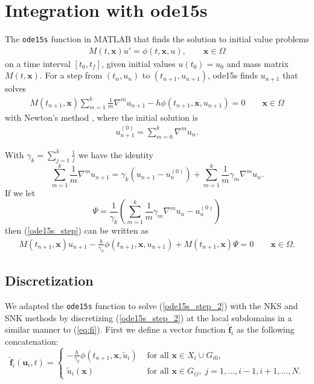 \section{Integration with ode15s}
The {\tt ode15s} function in MATLAB that finds the solution to initial value problems
\begin{align}
M(t,\bm{x}) u'=\phi(t,\bm{x},u), \qquad \bm{x} \in \Omega
\label{stiff_ode}
\end{align}
on a time interval $[t_0,t_f]$, given initial values $u(t_0)=u_0$ and mass matrix $M(t,\bm{x})$. For a step from $(t_n,u_n)$ to $(t_{n+1},u_{n+1})$, ode15s finds $u_{n+1}$ that solves
\begin{align}
 M(t_{n+1},\bm{x}) \sum_{m=1}^{k} \frac{1}{m} \nabla^m u_{n+1} - h \phi(t_{n+1},\bm{x},u_{n+1}) = 0 \qquad \bm{x} \in \Omega
 \label{ode15s_step}
\end{align}
with Newton's method \cite{shampine1997matlab}, where the initial solution is
\begin{align}
u_{n+1}^{(0)} = \sum_{m=0}^k \nabla^m u_n.
\end{align}

With $\gamma_k = \sum_{j=1}^k \frac{1}{j}$ we have the identity
\begin{equation}
	\sum_{m=1}^{k} \frac{1}{m} \nabla^m u_{n+1} = \gamma_k(u_{n+1}-u_n^{(0)}) + \sum_{m=1}^{k} \frac{1}{m} \gamma_m \nabla^m u_{n}.
\end{equation}
If we let
\begin{equation}
\Psi =  \frac{1}{\gamma_k}(\sum_{m=1}^{k} \frac{1}{m} \gamma_m \nabla^m u_{n} - u_n^{(0)})
\end{equation}
then
(\ref{ode15s_step}) can be written as
\begin{align}
M(t_{n+1},\bm{x}) u_{n+1} - \frac{h}{\gamma_k} \phi(t_{n+1},\bm{x},u_{n+1}) + M(t_{n+1},\bm{x}) \Psi = 0 \qquad \bm{x} \in \Omega.
 \label{ode15s_step_2}
\end{align}

\subsection{Discretization}
We adapted the {\tt ode15s} function to solve (\ref{ode15s_step_2}) with the NKS and SNK methods by discretizing (\ref{ode15s_step_2}) at the local subdomains in a similar manner to (\ref{eq:fi}). First we define a vector function $\bm{\hat{f}}_i$ as the following concatenation:
\begin{equation}
  \label{eq:fi_ode15s}
  \bm{\hat{f}}_i(\bm{u}_i,t) = 
  \begin{cases}
    - \frac{h}{\gamma_k} \phi(t_{n+1},\bm{x},\tilde{u}_i) & \text{ for all } \bm{x} \in X_i \cup G_{i0}, \\
    \tilde{u}_i(\bm{x}) & \text{ for all } \bm{x} \in G_{ij}, \; j=1,\ldots,i-1,i+1,\ldots,N.
  \end{cases}
\end{equation}

